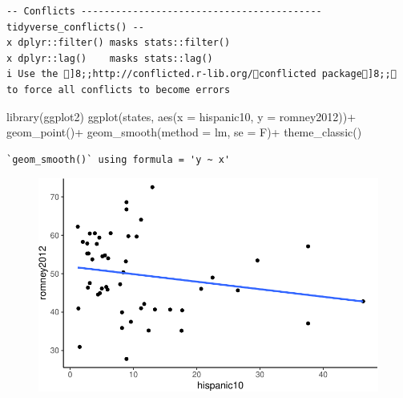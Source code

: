\documentclass[
  letterpaper,
  DIV=11,
  numbers=noendperiod]{scrartcl}
\newenvironment{Shaded}{\begin{snugshade}}{\end{snugshade}}
\newcommand{\AttributeTok}[1]{\textcolor[rgb]{0.40,0.45,0.13}{#1}}
\newcommand{\FunctionTok}[1]{\textcolor[rgb]{0.28,0.35,0.67}{#1}}
\newcommand{\NormalTok}[1]{\textcolor[rgb]{0.00,0.23,0.31}{#1}}
\newcommand{\SpecialCharTok}[1]{\textcolor[rgb]{0.37,0.37,0.37}{#1}}
\begin{document}
\begin{verbatim}
-- Conflicts ------------------------------------------ tidyverse_conflicts() --
x dplyr::filter() masks stats::filter()
x dplyr::lag()    masks stats::lag()
i Use the ]8;;http://conflicted.r-lib.org/conflicted package]8;; to force all conflicts to become errors
\end{verbatim}

\begin{Shaded}
\begin{Highlighting}[]
\FunctionTok{library}\NormalTok{(ggplot2)}
\FunctionTok{ggplot}\NormalTok{(states, }\FunctionTok{aes}\NormalTok{(}\AttributeTok{x =}\NormalTok{ hispanic10, }\AttributeTok{y =}\NormalTok{ romney2012))}\SpecialCharTok{+}
  \FunctionTok{geom\_point}\NormalTok{()}\SpecialCharTok{+}
  \FunctionTok{geom\_smooth}\NormalTok{(}\AttributeTok{method =}\NormalTok{ lm, }\AttributeTok{se =}\NormalTok{ F)}\SpecialCharTok{+}
  \FunctionTok{theme\_classic}\NormalTok{()}
\end{Highlighting}
\end{Shaded}

\begin{verbatim}
`geom_smooth()` using formula = 'y ~ x'
\end{verbatim}

\begin{figure}[H]

{\centering \includegraphics{problem_set_8_files/figure-pdf/unnamed-chunk-1-1.pdf}

}

\end{figure}

\begin{Shaded}
\end{Shaded}
\end{document}
